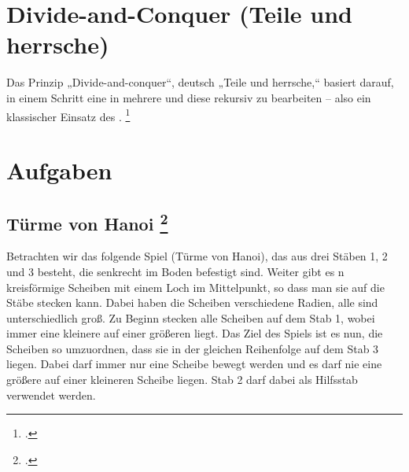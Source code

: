 \documentclass{lehramt-informatik-haupt}
\begin{document}

\chapter{Divide-and-Conquer (Teile und herrsche)}

\begin{quellen}
\item \cite[Seite 7-9]{aud:fs:3}
\item \cite[Seite 218-222 (PDF 236-240)]{saake}
\item \cite{wiki:teile-und-herrsche-verfahren}
\end{quellen}

Das Prinzip „Divide-and-conquer“, deutsch „Teile und herrsche,“ basiert
darauf, in einem Schritt eine  in mehrere
 und diese rekursiv zu bearbeiten –
also ein klassischer Einsatz des .
\footcite[Seite 219 (PDF 237)]{saake}


\chapter{Aufgaben}

\section{Türme von Hanoi
\footcite[Seite 1, Aufgabe 2: Türme von Hanoi]{aud:ab:7}
}

Betrachten wir das folgende Spiel (Türme von Hanoi), das aus drei Stäben
1, 2 und 3 besteht, die senkrecht im Boden befestigt sind. Weiter gibt
es n kreisförmige Scheiben mit einem Loch im Mittelpunkt, so dass man
sie auf die Stäbe stecken kann. Dabei haben die Scheiben verschiedene
Radien, alle sind unterschiedlich groß. Zu Beginn stecken alle Scheiben
auf dem Stab 1, wobei immer eine kleinere auf einer größeren liegt. Das
Ziel des Spiels ist es nun, die Scheiben so umzuordnen, dass sie in der
gleichen Reihenfolge auf dem Stab 3 liegen. Dabei darf immer nur eine
Scheibe bewegt werden und es darf nie eine größere auf einer kleineren
Scheibe liegen. Stab 2 darf dabei als Hilfsstab verwendet werden.
\end{document}
